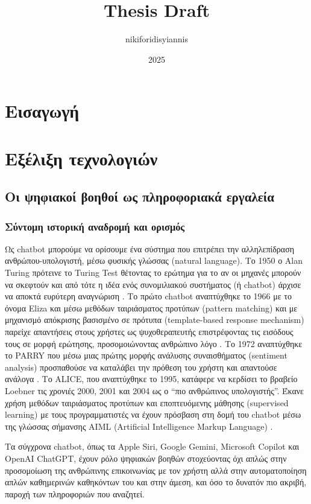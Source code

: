 \documentclass{article}
\title{Thesis Draft}
\author{nikiforidisyiannis }
\date{2025}
\begin{document}
\maketitle

\tableofcontents
\clearpage

\section{Εισαγωγή}

\section{Εξέλιξη τεχνολογιών}

\subsection{Οι ψηφιακοί βοηθοί ως πληροφοριακά εργαλεία}

\subsubsection{Σύντομη ιστορική αναδρομή και ορισμός}
\par Ως chatbot μπορούμε να ορίσουμε ένα σύστημα που επιτρέπει την αλληλεπίδραση ανθρώπου-υπολογιστή, μέσω φυσικής γλώσσας (natural language). Το 1950 ο Alan Turing πρότεινε το Turing Test θέτοντας το ερώτημα για το αν οι μηχανές μπορούν να σκεφτούν και από τότε η ιδέα ενός συνομιλιακού συστήματος (ή chatbot) άρχισε να αποκτά ευρύτερη αναγνώριση \cite{turing-1950}. Το πρώτο chatbot αναπτύχθηκε το 1966 με το όνομα Eliza και μέσω μεθόδων ταιριάσματος προτύπων (pattern matching) και με μηχανισμό απόκρισης βασισμένο σε πρότυπα (template-based response mechanism) παρείχε απαντήσεις στους χρήστες ως ψυχοθεραπευτής επιστρέφοντας τις εισόδους τους σε μορφή ερώτησης, προσομοιώνοντας ανθρώπινο λόγο \cite{weizenbaum-1966}. Το 1972 αναπτύχθηκε το PARRY που μέσω μιας πρώτης μορφής ανάλυσης συναισθήματος (sentiment analysis) προσπαθούσε να καταλάβει την πρόθεση του χρήστη και απαντούσε ανάλογα \cite{colby-1981}. Το ALICE, που αναπτύχθηκε το 1995, κατάφερε να κερδίσει το βραβείο Loebner τις χρονιές 2000, 2001 και 2004 ως ο “πιο ανθρώπινος υπολογιστής”. Έκανε χρήση μεθόδων ταιριάσματος προτύπων και εποπτευόμενης μάθησης (supervised learning) με τους προγραμματιστές να έχουν πρόσβαση στη δομή του chatbot μέσω της γλώσσας σήμανσης AIML (Artificial Intelligence Markup Language) \cite{wallace-2007}.
\par Τα σύγχρονα chatbot, όπως τα Apple Siri, Google Gemini, Microsoft Copilot και OpenAI ChatGPT, έχουν ρόλο ψηφιακών βοηθών στοχεύοντας όχι απλώς στην προσομοίωση της ανθρώπινης επικοινωνίας με τον χρήστη αλλά στην αυτοματοποίηση απλών καθημερινών καθηκόντων του και στην άμεση, και όσο το δυνατόν πιο ακριβή, παροχή των πληροφοριών που αναζητεί.
\end{document}
